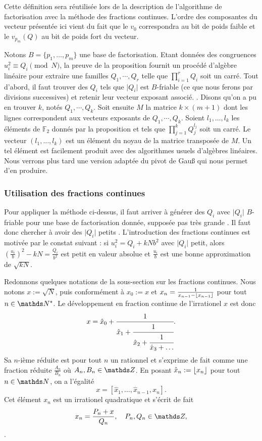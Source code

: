 \begin{remarque}
    Cette définition sera réutilisée lors de la description de l'algorithme
    de factorisation avec la méthode des fractions continues. L'ordre des
    composantes du vecteur présentée ici vient du fait que le $v_0$ correspondra
    au bit de poids faible et le $v_{p_m}(Q)$ au bit de poids fort du vecteur. \\ 
\end{remarque}

Notons $B = \{p_1, \dots, p_m\}$ une base de factorisation. Etant données
des congruences $u_i^2 \equiv Q_i \pmod{N}$, la preuve de la proposition 
fournit un procédé d'algèbre linéaire pour extraire une familles $Q_1,
\cdots, Q_r$ telle que $\prod_{i=1}^r Q_i$ soit un carré. Tout d'abord,
il faut trouver des $Q_i$ tels que $ \lvert Q_i \rvert$ est $B$-friable
(ce que nous ferons par divisions successives) et retenir leur vecteur 
exposant associé. . 
Disons qu'on a pu en trouver $k$, notés $Q_1, \cdots, Q_k$.
Soit ensuite $M$ la matrice $k\times(m+1)$ dont les lignes correspondent
aux vecteurs exposants de $Q_{1}, \cdots, Q_{k}$. Soient $l_{1}, \dots,
l_{k}$ les éléments de $\mathbb{F}_2$ donnés par la proposition et tels que
$\prod_{j=1}^k Q_{j}^{l_j} $ soit un carré. Le vecteur $(l_1, \dots,
l_{k})$ est un élément du noyau de la matrice transposée de $M$. Un tel
élément est facilement produit avec des algorithmes usuels d'algèbres
linéaires. Nous verrons plus tard une version adaptée du pivot
de Gau\ss{} qui nous permet d'en produire.

\subsubsection{Utilisation des fractions continues}

Pour appliquer la méthode ci-dessus, il faut arriver à générer des $Q_i$ 
avec $\lvert  Q_i \rvert$ $B$-friable pour une base de factorisation donnée,
supposée \og{} pas très grande \fg. Il faut donc chercher à avoir des
$\lvert Q_i \rvert$ \og{} petits \fg. L'introduction des fractions continues
est motivée par le constat suivant : si $u_i^2 = Q_i + kNb^2$ avec $\lvert 
Q_i \rvert$ petit, alors $\left(\frac{u_i}{b}\right)^2 - kN = \frac{Q_i}{b^2}$
est petit en valeur absolue et $\frac{u_i}{b}$ est une bonne approximation de 
$\sqrt{kN}$.


Redonnons quelques notations de la sous-section  sur les fractions
continues. Nous notons $x := \sqrt{N}$, puis conformément à  $x_0 :=
x$ et $x_n = \frac{1}{x_{n-1}- \lfloor x_{n-1}\rfloor}$ pour tout $n\in \N^*$. Le
développement en fraction continue de l'irrationel $x$ est donc \[x = \hat{x}_0
+ \cfrac{1}{\hat{x}_1 + \cfrac{1}{\hat{x}_2 + \cfrac{1}{\hat{x}_3 + \dots}}}.\]
Sa $n$-ième réduite est pour tout $n$ un rationnel et s'exprime de fait comme
une fraction réduite $\frac{A_n}{B_n}$ où $A_n, B_n\in \Z$.  En posant
$\hat{x}_n := \lfloor x_n\rfloor$ pour tout $n\in \N$, on a l'égalité  \[x =
[\hat{x}_1, \dots, \hat{x}_{n-1}, x_n].\] Cet élément $x_n$ est un irrationel
quadratique et s'écrit de fait  \[x_n = \frac{P_n + x}{Q_n},\quad P_n,
Q_n\in \Z,\]. 

